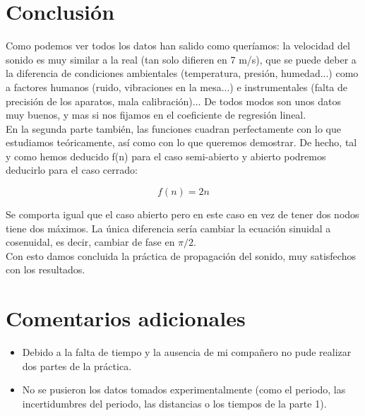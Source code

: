 \documentclass[12pt,a4paper]{article}
\begin{document}
\section{Conclusión}
Como podemos ver todos los datos han salido como queríamos: la velocidad del sonido es muy similar a la real (tan solo difieren en 7 m/s), que se puede deber a la diferencia de condiciones ambientales (temperatura, presión, humedad...) como a factores humanos (ruido, vibraciones en la mesa...) e instrumentales (falta de precisión de los aparatos, mala calibración)... De todos modos son unos datos muy buenos, y mas si nos fijamos en el coeficiente de regresión lineal. \\

En la segunda parte también, las funciones cuadran perfectamente con lo que estudiamos teóricamente, así como con lo que queremos demostrar. De hecho, tal y como hemos deducido f(n) para el caso semi-abierto y abierto podremos deducirlo para el caso cerrado:

\begin{equation}
f(n) = 2n 
\end{equation}

Se comporta igual que el caso abierto pero en este caso en vez de tener dos nodos tiene dos máximos. La única diferencia sería cambiar la ecuación sinuidal a cosenuidal, es decir, cambiar de fase en $\pi/2$. \\

 
Con esto damos concluida la práctica de propagación del sonido, muy satisfechos con los resultados.  

\section{Comentarios adicionales}
\begin{itemize}
\item Debido a la falta de tiempo y la ausencia de mi compañero no pude realizar dos partes de la práctica. 
\item No se pusieron los datos tomados experimentalmente (como el periodo, las incertidumbres del periodo, las distancias o los tiempos de la parte 1). 
\end{itemize}
\end{document}
